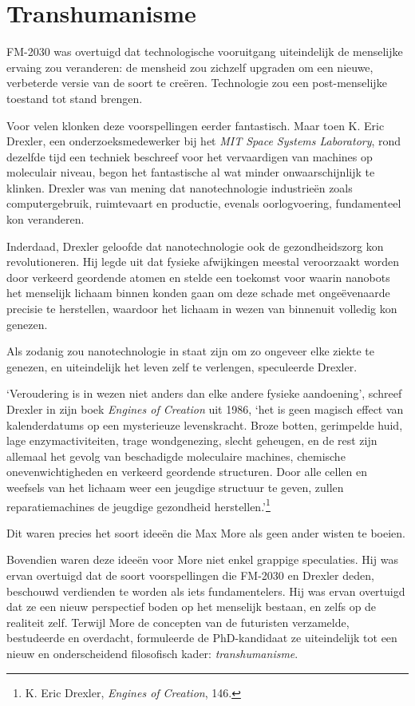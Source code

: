 \documentclass[
  a5paper,
  smalldemyvopaper,11pt,twoside,onecolumn,openright,extrafontsizes,
hidelinks]{memoir}
\begin{document}
\section{Transhumanisme}\label{transhumanisme}

FM-2030 was overtuigd dat technologische vooruitgang uiteindelijk de
menselijke ervaing zou veranderen: de mensheid zou zichzelf upgraden om
een nieuwe, verbeterde versie van de soort te creëren. Technologie zou
een post-menselijke toestand tot stand brengen.

Voor velen klonken deze voorspellingen eerder fantastisch. Maar toen K.
Eric Drexler, een onderzoeksmedewerker bij het \emph{MIT Space Systems
Laboratory}, rond dezelfde tijd een techniek beschreef voor het
vervaardigen van machines op moleculair niveau, begon het fantastische
al wat minder onwaarschijnlijk te klinken. Drexler was van mening dat
nanotechnologie industrieën zoals computergebruik, ruimtevaart en
productie, evenals oorlogvoering, fundamenteel kon veranderen.

Inderdaad, Drexler geloofde dat nanotechnologie ook de gezondheidszorg
kon revolutioneren. Hij legde uit dat fysieke afwijkingen meestal
veroorzaakt worden door verkeerd geordende atomen en stelde een toekomst
voor waarin nanobots het menselijk lichaam binnen konden gaan om deze
schade met ongeëvenaarde precisie te herstellen, waardoor het lichaam in
wezen van binnenuit volledig kon genezen.

Als zodanig zou nanotechnologie in staat zijn om zo ongeveer elke ziekte
te genezen, en uiteindelijk het leven zelf te verlengen, speculeerde
Drexler.

`Veroudering is in wezen niet anders dan elke andere fysieke
aandoening', schreef Drexler in zijn boek \emph{Engines of Creation} uit
1986, `het is geen magisch effect van kalenderdatums op een mysterieuze
levenskracht. Broze botten, gerimpelde huid, lage enzymactiviteiten,
trage wondgenezing, slecht geheugen, en de rest zijn allemaal het gevolg
van beschadigde moleculaire machines, chemische onevenwichtigheden en
verkeerd geordende structuren. Door alle cellen en weefsels van het
lichaam weer een jeugdige structuur te geven, zullen reparatiemachines
de jeugdige gezondheid herstellen.'\footnote{K. Eric Drexler,
  \emph{Engines of Creation}, 146.}

Dit waren precies het soort ideeën die Max More als geen ander wisten te
boeien.

Bovendien waren deze ideeën voor More niet enkel grappige speculaties.
Hij was ervan overtuigd dat de soort voorspellingen die FM-2030 en
Drexler deden, beschouwd verdienden te worden als iets fundamentelers.
Hij was ervan overtuigd dat ze een nieuw perspectief boden op het
menselijk bestaan, en zelfs op de realiteit zelf. Terwijl More de
concepten van de futuristen verzamelde, bestudeerde en overdacht,
formuleerde de PhD-kandidaat ze uiteindelijk tot een nieuw en
onderscheidend filosofisch kader: \emph{transhumanisme}.
\end{document}
